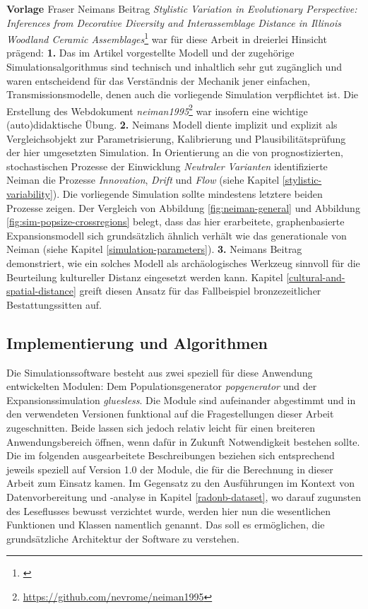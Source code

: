 \documentclass[openany,twoside,twocolumn]{book}
\let\rmarkdownfootnote\footnote%
\def\footnote{\protect\rmarkdownfootnote}
\begin{document}
\textbf{Vorlage \textcite{neiman_stylistic_1995}} \newline  Fraser
Neimans Beitrag \emph{Stylistic Variation in Evolutionary Perspective:
Inferences from Decorative Diversity and Interassemblage Distance in
Illinois Woodland Ceramic Assemblages}\footnote{\textcite{neiman_stylistic_1995}}
war für diese Arbeit in dreierlei Hinsicht prägend: \textbf{1.} Das im
Artikel vorgestellte Modell und der zugehörige Simulationsalgorithmus
sind technisch und inhaltlich sehr gut zugänglich und waren entscheidend
für das Verständnis der Mechanik jener einfachen, Transmissionsmodelle,
denen auch die vorliegende Simulation verpflichtet ist. Die Erstellung
des Webdokument \emph{neiman1995}\footnote{\url{https://github.com/nevrome/neiman1995}}
war insofern eine wichtige (auto)didaktische Übung. \textbf{2.} Neimans
Modell diente implizit und explizit als Vergleichsobjekt zur
Parametrisierung, Kalibrierung und Plausibilitätsprüfung der hier
umgesetzten Simulation. In Orientierung an die von
\textcite{dunnell1978style} prognostizierten, stochastischen Prozesse
der Einwicklung \emph{Neutraler Varianten} identifizierte Neiman die
Prozesse \emph{Innovation}, \emph{Drift} und \emph{Flow} (siehe Kapitel
\ref{stylistic-variability}). Die vorliegende Simulation sollte
mindestens letztere beiden Prozesse zeigen. Der Vergleich von Abbildung
\ref{fig:neiman-general} und Abbildung
\ref{fig:sim-popsize-crossregions} belegt, dass das hier erarbeitete,
graphenbasierte Expansionsmodell sich grundsätzlich ähnlich verhält wie
das generationale von Neiman (siehe Kapitel
\ref{simulation-parameters}). \textbf{3.} Neimans Beitrag demonstriert,
wie ein solches Modell als archäologisches Werkzeug sinnvoll für die
Beurteilung kultureller Distanz eingesetzt werden kann. Kapitel
\ref{cultural-and-spatial-distance} greift diesen Ansatz für das
Fallbeispiel bronzezeitlicher Bestattungssitten auf.

\hypertarget{implementierung-und-algorithmen}{%
\subsection{Implementierung und
Algorithmen}\label{implementierung-und-algorithmen}}

Die Simulationssoftware besteht aus zwei speziell für diese Anwendung
entwickelten Modulen: Dem Populationsgenerator \emph{popgenerator} und
der Expansionssimulation \emph{gluesless}. Die Module sind aufeinander
abgestimmt und in den verwendeten Versionen funktional auf die
Fragestellungen dieser Arbeit zugeschnitten. Beide lassen sich jedoch
relativ leicht für einen breiteren Anwendungsbereich öffnen, wenn dafür
in Zukunft Notwendigkeit bestehen sollte. Die im folgenden
ausgearbeitete Beschreibungen beziehen sich entsprechend jeweils
speziell auf Version 1.0 der Module, die für die Berechnung in dieser
Arbeit zum Einsatz kamen. Im Gegensatz zu den Ausführungen im Kontext
von Datenvorbereitung und -analyse in Kapitel \ref{radonb-dataset}, wo
darauf zugunsten des Leseflusses bewusst verzichtet wurde, werden hier
nun die wesentlichen Funktionen und Klassen namentlich genannt. Das soll
es ermöglichen, die grundsätzliche Architektur der Software zu
verstehen.
\end{document}
